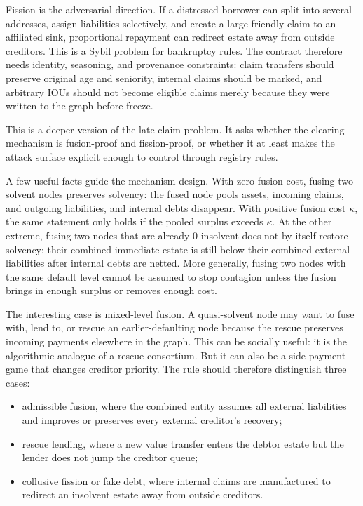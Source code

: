 \documentclass[11pt,oneside]{article}
\begin{document}
Fission is the adversarial direction. If a distressed borrower can split into
several addresses, assign liabilities selectively, and create a large friendly
claim to an affiliated sink, proportional repayment can redirect estate away
from outside creditors. This is a Sybil problem for bankruptcy rules. The
contract therefore needs identity, seasoning, and provenance constraints:
claim transfers should preserve original age and seniority, internal claims
should be marked, and arbitrary IOUs should not become eligible claims merely
because they were written to the graph before freeze.

This is a deeper version of the late-claim problem. It asks whether the clearing
mechanism is fusion-proof and fission-proof, or whether it at least makes the
attack surface explicit enough to control through registry rules.

A few useful facts guide the mechanism design. With zero fusion cost, fusing two
solvent nodes preserves solvency: the fused node pools assets, incoming claims,
and outgoing liabilities, and internal debts disappear. With positive fusion
cost $\kappa$, the same statement only holds if the pooled surplus exceeds
$\kappa$. At the other extreme, fusing two nodes that are already
$0$-insolvent does not by itself restore solvency; their combined immediate
estate is still below their combined external liabilities after internal debts
are netted. More generally, fusing two nodes with the same default level cannot
be assumed to stop contagion unless the fusion brings in enough surplus or
removes enough cost.

The interesting case is mixed-level fusion. A quasi-solvent node may want to
fuse with, lend to, or rescue an earlier-defaulting node because the rescue
preserves incoming payments elsewhere in the graph. This can be socially useful:
it is the algorithmic analogue of a rescue consortium. But it can also be a
side-payment game that changes creditor priority. The rule should therefore
distinguish three cases:

\begin{itemize}[leftmargin=1.5em]
  \item admissible fusion, where the combined entity assumes all external
  liabilities and improves or preserves every external creditor's recovery;
  \item rescue lending, where a new value transfer enters the debtor estate but
  the lender does not jump the creditor queue;
  \item collusive fission or fake debt, where internal claims are manufactured
  to redirect an insolvent estate away from outside creditors.
\end{itemize}
\end{document}
